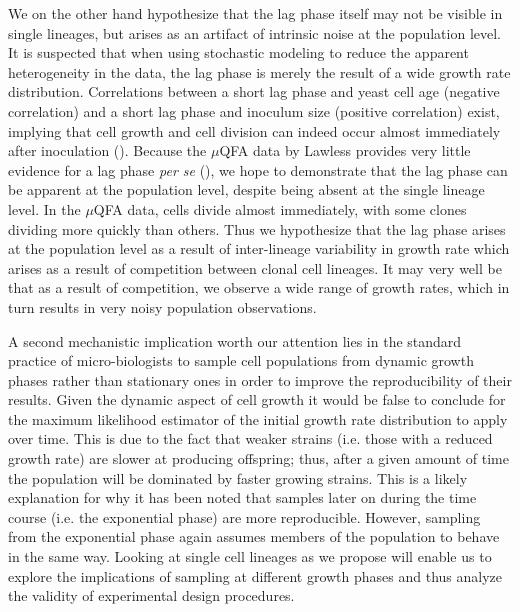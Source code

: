 \documentclass{bioinfo}
\begin{document}
We on the other hand hypothesize that the lag phase itself may not be visible in single lineages, but arises as an artifact of intrinsic noise at the population level. It is suspected that when using stochastic modeling to reduce the apparent heterogeneity in the data, the lag phase is merely the result of a wide growth rate distribution. Correlations between a short lag phase and yeast cell age (negative correlation) and a short lag phase and inoculum size (positive correlation) exist, implying that cell growth and cell division can indeed occur almost immediately after inoculation (\citealp{Ginovart11}). Because the  $\mu$QFA data by Lawless provides very little evidence for a lag phase \textit{per se} (\citealp{Lawless13}), we hope to demonstrate that the lag phase can be apparent at the population level, despite being absent at the single lineage level. In the $\mu$QFA data, cells divide almost immediately, with some clones dividing more quickly than others. Thus we hypothesize that the lag phase arises at the population level as a result of inter-lineage variability in growth rate which arises as a result of competition between clonal cell lineages. It may very well be that as a result of competition, we observe a wide range of growth rates, which in turn results in very noisy population observations. 

A second mechanistic implication worth our attention lies in the standard practice of micro-biologists to sample cell populations from dynamic growth phases rather than stationary ones in order to improve the reproducibility of their results. Given the dynamic aspect of cell growth it would be false to conclude for the maximum likelihood estimator of the initial growth rate distribution to apply over time. This is due to the fact that weaker strains (i.e. those with a reduced growth rate) are slower at producing offspring; thus, after a given amount of time the population will be dominated by faster growing strains. This is a likely explanation for why it has been noted that samples later on during the time course (i.e. the exponential phase) are more reproducible. However, sampling from the exponential phase again assumes members of the population to behave in the same way. Looking at single cell lineages as we propose will enable us to explore the implications of sampling at different growth phases and thus analyze the validity of experimental design procedures. 
\end{document}
